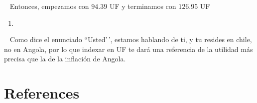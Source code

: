\documentclass[
  letterpaper,
  DIV=11,
  numbers=noendperiod]{scrreport}
\providecommand{\tightlist}{%
  \setlength{\itemsep}{0pt}\setlength{\parskip}{0pt}}\usepackage{longtable,booktabs,array}
\newlength{\cslhangindent}
\newlength{\cslentryspacingunit} %
\newenvironment{CSLReferences}[2] %
 {%
  \setlength{\parindent}{0pt}
  \ifodd #1
  \let\oldpar\par
  \def\par{\hangindent=\cslhangindent\oldpar}
  \fi
  \setlength{\parskip}{#2\cslentryspacingunit}
 }%
 {}
\begin{document}
~ Entonces, empezamos con \(94.39\) UF y terminamos con \(126.95\) UF

\begin{enumerate}
\def\labelenumi{\arabic{enumi})}
\setcounter{enumi}{3}
\tightlist
\item
\end{enumerate}

~ Como dice el enunciado ``Usted'\,', estamos hablando de ti, y tu
resides en chile, no en Angola, por lo que indexar en UF te dará una
referencia de la utilidad más precisa que la de la inflación de Angola.


\hypertarget{references}{%
\chapter*{References}\label{references}}


\hypertarget{refs}{}
\begin{CSLReferences}{0}{0}
\end{CSLReferences}
\end{document}
